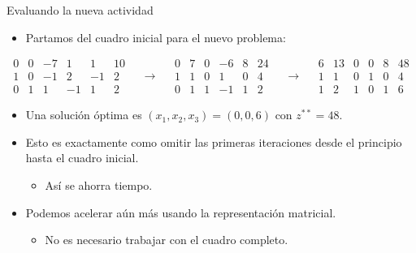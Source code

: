 \documentclass{beamer}
\begin{document}
\begin{frame}{Evaluando la nueva actividad}
    \begin{itemize}
        \item Partamos del cuadro inicial para el nuevo problema:
    \end{itemize}
    {\tiny
    \[
    \begin{array}{ccccc|c}
        0 & 0 & -7 & 1 & 1 & 10 \\
        \hline
        1 & 0 & -1 & 2 & -1 & 2 \\
        0 & 1 & 1 & -1 & 1 & 2
    \end{array}
    \quad \rightarrow \quad
    \begin{array}{ccccc|c}
        0 & 7 & 0 & -6 & 8 & 24 \\
        \hline
        1 & 1 & 0 & 1 & 0 & 4 \\
        0 & 1 & 1 & -1 & 1 & 2
    \end{array}
    \quad \rightarrow \quad
    \begin{array}{ccccc|c}
        6 & 13 & 0 & 0 & 8 & 48 \\
        \hline
        1 & 1 & 0 & 1 & 0 & 4 \\
        1 & 2 & 1 & 0 & 1 & 6
    \end{array}
    \]
    }
    \begin{itemize}
        \item Una solución óptima es \( (x_1, x_2, x_3) = (0, 0, 6) \) con \( z^{**} = 48 \).
        \item Esto es exactamente como omitir las primeras iteraciones desde el principio hasta el cuadro inicial.
        \begin{itemize}
            \item Así se ahorra tiempo.
        \end{itemize}
        \item Podemos acelerar aún más usando la representación matricial.
        \begin{itemize}
            \item No es necesario trabajar con el cuadro completo.
        \end{itemize}
    \end{itemize}
\end{frame}
\end{document}
